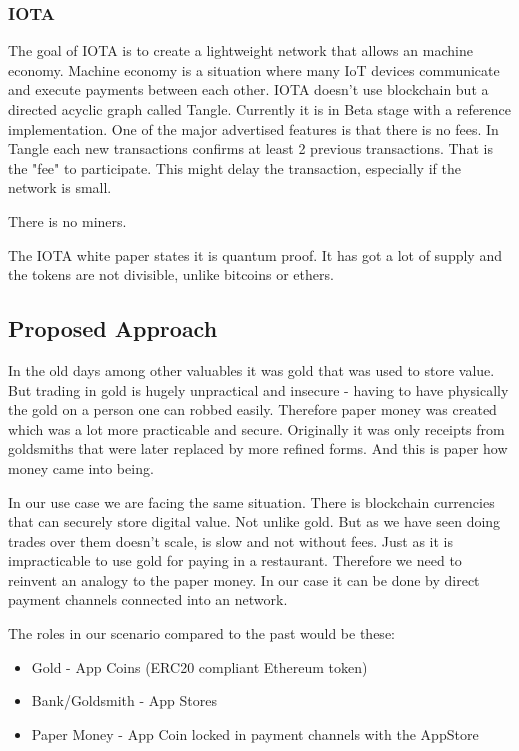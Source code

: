 \subsubsection{IOTA}
The goal of IOTA is to create a lightweight network that allows an machine economy. Machine economy is a situation where many IoT devices communicate and execute payments between each other. IOTA doesn't use blockchain but a directed acyclic graph called Tangle. Currently it is in Beta stage with a reference implementation. One of the major advertised features is that there is no fees. In Tangle each new transactions confirms at least 2 previous transactions. That is the "fee" to participate. This might delay the transaction, especially if the network is small. 

There is no miners.

The IOTA white paper states it is quantum proof. It has got a lot of supply and the tokens are not divisible, unlike bitcoins or ethers.

\subsection{Proposed Approach}
In the old days among other valuables it was gold that was used to store value. But trading in gold is hugely unpractical and insecure - having to have physically the gold on a person one can robbed easily. Therefore paper money was created which was a lot more practicable and secure. Originally it was only receipts from goldsmiths that were later replaced by more refined forms. And this is paper how money came into being.

In our use case we are facing the same situation. There is blockchain currencies that can securely store digital value. Not unlike gold. But as we have seen doing trades over them doesn't scale, is slow and not without fees. Just as it is impracticable to use gold for paying in a restaurant. Therefore we need to reinvent an analogy to the paper money. In our case it can be done by direct payment channels connected into an network.

The roles in our scenario compared to the past would be these:

\begin{itemize}
    \item Gold - App Coins (ERC20 compliant Ethereum token)
    \item Bank/Goldsmith - App Stores
    \item Paper Money - App Coin locked in payment channels with the AppStore
\end{itemize}

